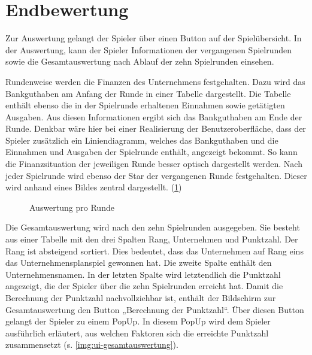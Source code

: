 \section{Endbewertung}
\label{sec:ui-endbewertung}

Zur Auswertung gelangt der Spieler über einen Button auf der Spielübersicht. In der Auswertung, kann der Spieler Informationen der vergangenen Spielrunden sowie die Gesamtauswertung nach Ablauf der zehn Spielrunden einsehen.
 
Rundenweise werden die Finanzen des Unternehmens festgehalten. Dazu wird das Bankguthaben am Anfang der Runde in einer Tabelle dargestellt. Die Tabelle enthält ebenso die in der Spielrunde erhaltenen Einnahmen sowie getätigten Ausgaben. Aus diesen Informationen ergibt sich das Bankguthaben am Ende der Runde. Denkbar wäre hier bei einer Realisierung der Benutzeroberfläche, dass der Spieler zusätzlich ein Liniendiagramm, welches das Bankguthaben und die Einnahmen und Ausgaben der Spielrunde enthält, angezeigt bekommt. So kann die Finanzsituation der jeweiligen Runde besser optisch dargestellt werden. Nach jeder Spielrunde wird ebenso der Star der vergangenen Runde festgehalten. Dieser wird anhand eines Bildes zentral dargestellt. (\ref{img:ui-auswertung})

\begin{figure}[htb]
  \centering
  \caption{Auswertung pro Runde}
  \label{img:ui-auswertung}
\end{figure}
 
Die Gesamtauswertung wird nach den zehn Spielrunden ausgegeben. Sie besteht aus einer Tabelle mit den drei Spalten Rang, Unternehmen und Punktzahl.  Der Rang ist absteigend sortiert. Dies bedeutet, dass das Unternehmen auf Rang eins das Unternehmensplanspiel gewonnen hat. Die zweite Spalte enthält den Unternehmensnamen. In der letzten Spalte wird letztendlich die Punktzahl angezeigt, die der Spieler über die zehn Spielrunden erreicht hat. Damit die Berechnung der Punktzahl nachvollziehbar ist, enthält der Bildschirm zur Gesamtauswertung den Button „Berechnung der Punktzahl“. Über diesen Button gelangt der Spieler zu einem PopUp. In diesem PopUp wird dem Spieler ausführlich erläutert, aus welchen Faktoren sich die erreichte Punktzahl zusammensetzt (s. \ref{img:ui-gesamtauswertung}).

